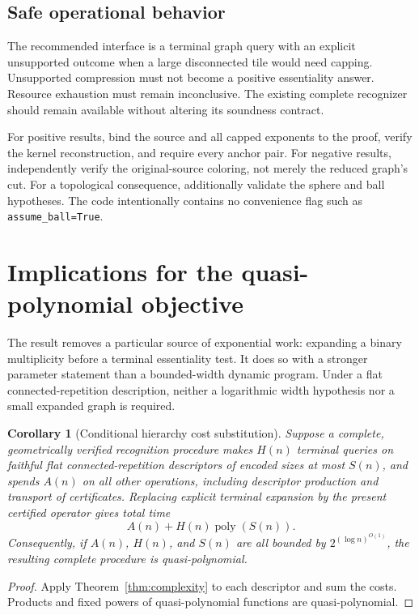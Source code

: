\documentclass[11pt]{article}
\newtheorem{corollary}[theorem]{Corollary}
\theoremstyle{remark}\newtheorem{remark}[theorem]{Remark}
\newcommand{\poly}{\operatorname{poly}}
\DeclareRobustCommand{\code}[1]{\nolinkurl{#1}}
\begin{document}
\subsection{Safe operational behavior}
The recommended interface is a terminal graph query with an explicit unsupported outcome when a large disconnected tile would need capping. Unsupported compression must not become a positive essentiality answer. Resource exhaustion must remain inconclusive. The existing complete recognizer should remain available without altering its soundness contract.

For positive results, bind the source and all capped exponents to the proof, verify the kernel reconstruction, and require every anchor pair. For negative results, independently verify the original-source coloring, not merely the reduced graph's cut. For a topological consequence, additionally validate the sphere and ball hypotheses. The code intentionally contains no convenience flag such as \code{assume_ball=True}.

\section{Implications for the quasi-polynomial objective}
The result removes a particular source of exponential work: expanding a binary multiplicity before a terminal essentiality test. It does so with a stronger parameter statement than a bounded-width dynamic program. Under a flat connected-repetition description, neither a logarithmic width hypothesis nor a small expanded graph is required.

\begin{corollary}[Conditional hierarchy cost substitution]
Suppose a complete, geometrically verified recognition procedure makes $H(n)$ terminal queries on faithful flat connected-repetition descriptors of encoded sizes at most $S(n)$, and spends $A(n)$ on all other operations, including descriptor production and transport of certificates. Replacing explicit terminal expansion by the present certified operator gives total time
\[
 A(n)+H(n)\poly(S(n)).
\]
Consequently, if $A(n)$, $H(n)$, and $S(n)$ are all bounded by $2^{(\log n)^{O(1)}}$, the resulting complete procedure is quasi-polynomial.
\end{corollary}
\begin{proof}
Apply Theorem~\ref{thm:complexity} to each descriptor and sum the costs. Products and fixed powers of quasi-polynomial functions are quasi-polynomial.
\end{proof}
\end{document}
